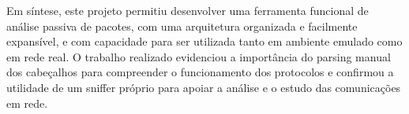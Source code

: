 \documentclass[a4paper]{article}
\begin{document}
Em síntese, este projeto permitiu desenvolver uma ferramenta funcional de análise passiva de pacotes, com uma arquitetura organizada e facilmente expansível, e com capacidade para ser utilizada tanto em ambiente emulado como em rede real. O trabalho realizado evidenciou a importância do parsing manual dos cabeçalhos para compreender o funcionamento dos protocolos e confirmou a utilidade de um sniffer próprio para apoiar a análise e o estudo das comunicações em rede.
\end{document}
